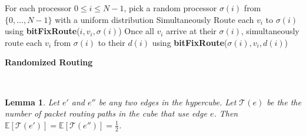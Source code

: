 \documentclass[psamsfonts, 10pt]{amsart}
\newtheorem{lem}[thm]{Lemma}
\theoremstyle{definition}
\theoremstyle{remark}
\numberwithin{equation}{section}
\newcommand{\E}{\mathbb{E}}
\newcommand{\creturn}{\mbox{}\\}
\begin{document}
\begin{algorithm}[H]
For each processor $0 \leq i \leq N-1$, pick a random processor $\sigma(i)$ from $\{0, ... , N-1\}$ with a uniform distribution\;
Simultaneously Route each $v_i$ to $\sigma(i)$ using {\bf bitFixRoute}($i, v_i, \sigma(i)$)\;
Once all $v_i$ arrive at their $\sigma(i)$, simultaneously route each $v_i$ from $\sigma(i)$ to their $d(i)$ using
{\bf bitFixRoute}($\sigma(i), v_i, d(i)$)\;
\caption{{\bf Randomized Routing}}
\end{algorithm}\creturn



\begin{lem}
Let $e'$ and $e''$ be any two edges in the hypercube. Let $\mathcal{T}(e)$ be the the number of packet routing paths in the cube that use edge $e$. Then $\E[\mathcal{T}(e')] = \E[\mathcal{T}(e'')] = \frac{1}{2}$.
\end{lem}
\end{document}
